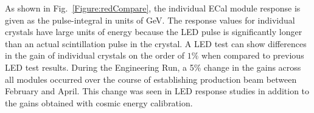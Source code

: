 As shown in Fig.~\ref{Figure:redCompare}, the individual ECal module response is given as the pulse-integral in units of GeV. The response values for individual crystals have large units of energy because the LED pulse is significantly longer than an actual scintillation pulse in the crystal. A LED test can show differences in the gain of individual crystals on the order of $1\%$ when compared to previous LED test results. During the Engineering Run, a 5$\%$ change in the gains across all modules occurred over the course of establishing production beam between February and April. This change was seen in LED response studies in addition to the gains obtained with cosmic energy calibration.
